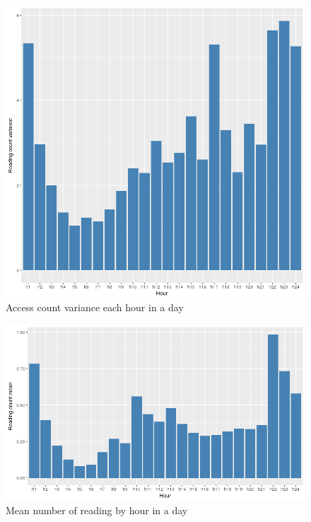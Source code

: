 \documentclass[English]{dicomopapers}
\begin{document}
\begin{figure}[ht]
  \vspace*{-2.5cm}
  \centering
  \includegraphics[width=\columnwidth,natwidth=827,natheight=805]{access_var.png}
  \caption{Access count variance each hour in a day}\label{fig:access_var}
\end{figure}
\begin{figure}[ht]
  \vspace*{-1.5cm}
  \centering
  \includegraphics[width=\columnwidth,natwidth=827,natheight=484]{access_mean.png}
  \caption{Mean number of reading by hour in a day}\label{fig:access_mean}
\end{figure}
\end{document}
